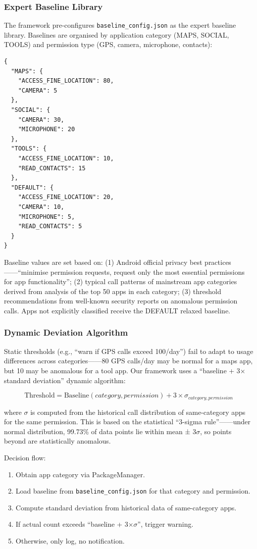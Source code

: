 \subsubsection{Expert Baseline Library}
The framework pre-configures \texttt{baseline\_config.json} as the expert baseline library. Baselines are organised by application category (MAPS, SOCIAL, TOOLS) and permission type (GPS, camera, microphone, contacts):

\begin{lstlisting}[caption=baseline\_config.json (expert baseline library)]
{
  "MAPS": {
    "ACCESS_FINE_LOCATION": 80,
    "CAMERA": 5
  },
  "SOCIAL": {
    "CAMERA": 30,
    "MICROPHONE": 20
  },
  "TOOLS": {
    "ACCESS_FINE_LOCATION": 10,
    "READ_CONTACTS": 15
  },
  "DEFAULT": {
    "ACCESS_FINE_LOCATION": 20,
    "CAMERA": 10,
    "MICROPHONE": 5,
    "READ_CONTACTS": 5
  }
}
\end{lstlisting}

Baseline values are set based on: (1) Android official privacy best practices——``minimise permission requests, request only the most essential permissions for app functionality''; (2) typical call patterns of mainstream app categories derived from analysis of the top 50 apps in each category; (3) threshold recommendations from well-known security reports on anomalous permission calls. Apps not explicitly classified receive the DEFAULT relaxed baseline.

\subsubsection{Dynamic Deviation Algorithm}
Static thresholds (e.g., ``warn if GPS calls exceed 100/day'') fail to adapt to usage differences across categories——80 GPS calls/day may be normal for a maps app, but 10 may be anomalous for a tool app. Our framework uses a ``baseline + 3× standard deviation'' dynamic algorithm:

\[
\text{Threshold} = \text{Baseline}(category, permission) + 3 \times \sigma_{category, permission}
\]

where $\sigma$ is computed from the historical call distribution of same-category apps for the same permission. This is based on the statistical ``3-sigma rule''——under normal distribution, 99.73\% of data points lie within mean ± 3$\sigma$, so points beyond are statistically anomalous.

Decision flow:
\begin{enumerate}
\item Obtain app category via PackageManager.
\item Load baseline from \texttt{baseline\_config.json} for that category and permission.
\item Compute standard deviation from historical data of same-category apps.
\item If actual count exceeds ``baseline + 3×$\sigma$'', trigger warning.
\item Otherwise, only log, no notification.
\end{enumerate}

